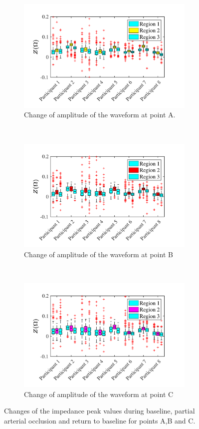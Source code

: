\begin{figure}[!htpb]
	\centering
	\begin{subfigure}[t]{0.48\textwidth}
	\centering
		\includegraphics[height=5.5cm,keepaspectratio,trim={0.5cm 0cm 1.5cm 0 cm}, clip]{figure_apa_3a} 
		\caption{Change of amplitude of the waveform at point A.}
		\label{fig:change_A_venous}
	\end{subfigure}%
	~ 
	\begin{subfigure}[t]{0.48\textwidth}
		\centering
		\includegraphics[height=5.5cm,keepaspectratio,trim={0.5cm 0cm 1.5cm 0 cm}, clip]{figure_apa_3b}    
		\caption{Change of amplitude of the waveform at point B}
		\label{fig:change_B_venous}
	\end{subfigure}
	~
	\begin{subfigure}[t]{0.48\textwidth}
		\centering
		\includegraphics[height=5.5cm,keepaspectratio,trim={0.5cm 0cm 1.5cm 0 cm}, clip]{figure_apa_3c}   
		\caption{Change of amplitude of the waveform at point C}
		\label{fig:change_C_venous}
	\end{subfigure}%
	\caption{Changes of the impedance peak values during baseline, partial arterial occlusion and return to baseline for points A,B and C.}
	\label{fig:iPG_change_points_venous}
\end{figure}


